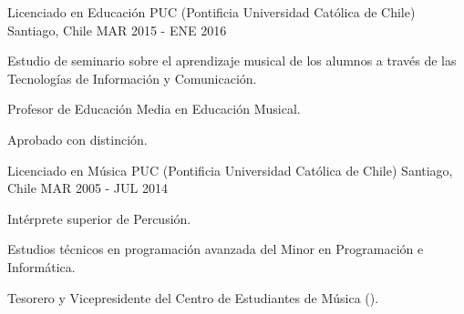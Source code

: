 

\begin{cventries}

  \cventry
    {Licenciado en Educación} %
    {PUC (Pontificia Universidad Católica de Chile)} %
    {Santiago, Chile} %
    {MAR 2015 - ENE 2016} %
    {
      \begin{cvitems} %
        \item {Estudio de seminario sobre el aprendizaje musical de los alumnos a través de las Tecnologías de Información y Comunicación.}
        \item {Profesor de Educación Media en Educación Musical.}
        \item {Aprobado con distinción.}
      \end{cvitems}
    }

  \cventry
    {Licenciado en Música} %
    {PUC (Pontificia Universidad Católica de Chile)} %
    {Santiago, Chile} %
    {MAR 2005 - JUL 2014} %
    {
	    \begin{cvitems} %
	     	\item {Intérprete superior de Percusión.}
	     	\item {Estudios técnicos en programación avanzada del Minor en Programación e Informática.}
	     	\item {Tesorero y Vicepresidente del Centro de Estudiantes de Música ().}
	    \end{cvitems}
    }

\end{cventries}
